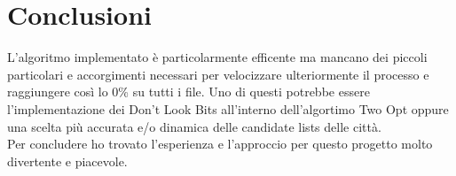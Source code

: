 \chapter*{Conclusioni}
\label{cha_conclusioni}

L'algoritmo implementato è particolarmente efficente ma mancano dei piccoli particolari e accorgimenti necessari 
per velocizzare ulteriormente il processo e raggiungere così lo 0\% su tutti i file.
Uno di questi potrebbe essere l'implementazione dei Don't Look Bits all'interno dell'algortimo Two
Opt oppure una scelta più accurata e/o dinamica delle candidate lists delle città. \\
Per concludere ho trovato l'esperienza e l'approccio per questo progetto molto divertente e piacevole. 